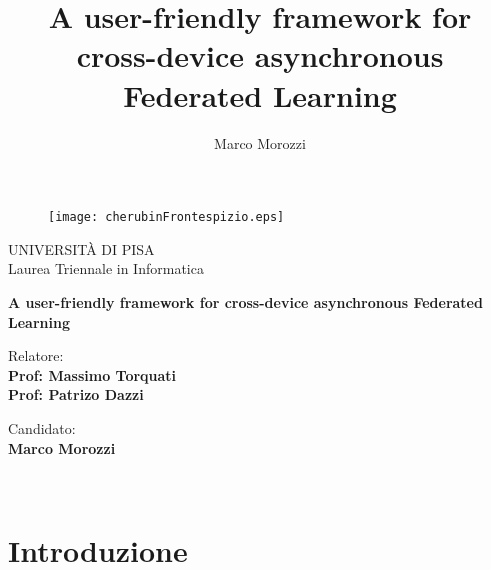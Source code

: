 \documentclass[a4paper, oneside, openright]{report}
\title{A user-friendly framework for cross-device asynchronous Federated Learning}
\author{Marco Morozzi}
\begin{document}
\clearpage{}

\begin{titlepage}
\begin{figure}[!htb]
    \centering
    \texttt{[image: cherubinFrontespizio.eps]}
\end{figure}

\begin{center}
    \LARGE{UNIVERSITÀ DI PISA}
\vspace{5mm}
    \\ \LARGE{Laurea Triennale in Informatica}
\end{center}

\vspace{10mm}
\begin{center}
    {\LARGE{\bf 
        A user-friendly framework for 
        cross-device asynchronous 
        Federated Learning  
    }}
\end{center}
\vspace{30mm}

\begin{minipage}[t]{0.47\textwidth}
	{\large{Relatore:}{\normalsize\vspace{3mm}
	\bf\\ \large{Prof: Massimo Torquati} \normalsize\vspace{3mm}\bf \\ \large{Prof: Patrizo Dazzi}}}
\end{minipage}
\hfill
\begin{minipage}[t]{0.47\textwidth}\raggedleft
	{\large{Candidato:}{\normalsize\vspace{3mm} \bf\\ \large{Marco Morozzi}}}
\end{minipage}

\vspace{30mm}
\hrulefill
\\

\end{titlepage}
\restoregeometry
\clearpage{}
\tableofcontents
\newpage
\clearpage{}\chapter{Introduzione}
\end{document}
